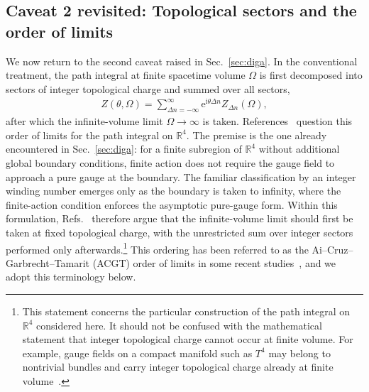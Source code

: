 \documentclass[review]{elsarticle}
\numberwithin{equation}{section}
\numberwithin{table}{section}
\numberwithin{figure}{section}
\def\i{\mathrm{i}}
\def\e{\mathrm{e}}
\begin{document}
\subsection{Caveat 2 revisited: Topological sectors and the order of limits}
\label{sec:reassessment-order-of-limits}

We now return to the second caveat raised in Sec.~\ref{sec:diga}. In the conventional treatment, the path integral at finite spacetime volume $\Omega$ is first decomposed into sectors of integer topological charge and summed over all sectors,
\begin{align}
    Z(\theta,\Omega)
    =
    \sum_{\Delta n=-\infty}^{\infty}
    \e^{\i\theta\Delta n}
    Z_{\Delta n}(\Omega),
    \label{eq:conventional-sector-sum-reassessment}
\end{align}
after which the infinite-volume limit $\Omega\to\infty$ is taken. References~\cite{Ai:2020ptm,Ai:2024cnp} question this order of limits for the path integral on $\mathbb R^4$. The premise is the one already encountered in Sec.~\ref{sec:diga}: for a finite subregion of $\mathbb R^4$ without additional global boundary conditions, finite action does not require the gauge field to approach a pure gauge at the boundary. The familiar classification by an integer winding number emerges only as the boundary is taken to infinity, where the finite-action condition enforces the asymptotic pure-gauge form. Within this formulation, Refs.~\cite{Ai:2020ptm,Ai:2024cnp} therefore argue that the infinite-volume limit should first be taken at fixed topological charge, with the unrestricted sum over integer sectors performed only afterwards.\footnote{This statement concerns the particular construction of the path integral on $\mathbb R^4$ considered here. It should not be confused with the mathematical statement that integer topological charge cannot occur at finite volume. For example, gauge fields on a compact manifold such as $T^4$ may belong to nontrivial bundles and carry integer topological charge already at finite volume~\cite{Leutwyler:1992yt,Ai:2024vfa}.} This ordering has been referred to as the Ai--Cruz--Garbrecht--Tamarit (ACGT) order of limits in some recent studies~\cite{Khoze:2025auv,Aghaie:2026pkf}, and we adopt this terminology below.
\end{document}

